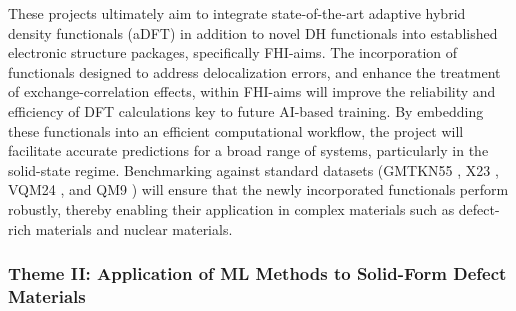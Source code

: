 \documentclass[11pt,english,calcwidth,compact]{nserc-appendix}
\begin{document}

These projects ultimately aim to integrate state-of-the-art adaptive hybrid density functionals (aDFT) in addition to novel DH functionals into established electronic structure packages, specifically FHI-aims. The incorporation of functionals designed to address delocalization errors, and enhance the treatment of exchange-correlation effects, within  FHI-aims will improve the reliability and efficiency of DFT calculations key to future AI-based training. 
By embedding these functionals into an efficient computational workflow, the project will facilitate accurate predictions for a broad range of systems, particularly in the solid-state regime.  
Benchmarking against standard datasets (GMTKN55 \cite{gmtkn55}, X23 \cite{x23,x23b}, VQM24 \cite{vqm24}, and QM9 \cite{qm9}) will ensure that the newly incorporated functionals perform robustly, thereby enabling their application in complex materials such as defect-rich materials and nuclear materials. 

\subsubsection*{Theme II: Application of ML Methods to Solid-Form Defect Materials}
\end{document}
